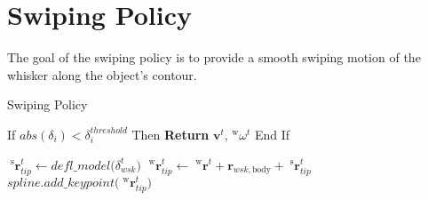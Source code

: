 \section{Swiping Policy}

The goal of the swiping policy is to provide a smooth swiping motion of the whisker along the object's contour.

\begin{algorithm}[htb]
    \caption{Swiping Policy}
    \begin{algorithmic}
        \State If \(abs(\delta_{i}) < \delta_{i}^{threshold}\)  Then
        \State \quad \textbf{Return} \(\boldsymbol{v}^{t}\), \(^{\mathrm{w}}\omega^{t}\)
        \State End If

        \State \(\;^{\mathrm{s}}\boldsymbol{r}_{tip}^{t} \gets defl\_model\Big(\delta_{wsk}^{t}\Big)\) 
        \State \(\;^{\mathrm{w}}\boldsymbol{r}_{tip}^{t} \gets \;^{\mathrm{w}}\boldsymbol{r}^{t} + \boldsymbol{r}_{wsk, \textrm{body}} + \;^{\mathrm{s}}\boldsymbol{r}_{tip}^{t}\) 
        \State \(spline.add\_keypoint\big(\;^{\mathrm{w}}\boldsymbol{r}_{tip}^{t}\big)\) 


\end{algorithmic}
\end{algorithm}
